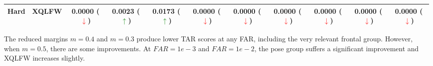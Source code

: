 \documentclass[class=report, crop=false, a4paper, 12pt]{standalone}
\begin{document}
\begin{table}[H]
{\begin{tabular}{cl|ccc|ccc|ccc|}
    \multicolumn{1}{|c|}{\multirow{-2}{*}{Hard}}    & XQLFW    & \multicolumn{1}{c|}{{\color[HTML]{333333} 0.0000 (\textcolor{red}{$\downarrow$})}} & \multicolumn{1}{c|}{{\color[HTML]{333333} 0.0023 (\textcolor{green}{$\uparrow$})}} & {\color[HTML]{333333} 0.0173 (\textcolor{green}{$\uparrow$})} & \multicolumn{1}{c|}{0.0000 (\textcolor{red}{$\downarrow$})} & \multicolumn{1}{c|}{0.0000 (\textcolor{red}{$\downarrow$})} & 0.0000 (\textcolor{red}{$\downarrow$}) & \multicolumn{1}{c|}{0.0000 (\textcolor{red}{$\downarrow$})} & \multicolumn{1}{c|}{0.0000 (\textcolor{red}{$\downarrow$})} & 0.0000 (\textcolor{red}{$\downarrow$}) \\ \hline
    \end{tabular}%
    }
\end{table}

The reduced margins $m=0.4$ and $m=0.3$ produce lower TAR scores at any FAR, including the very relevant frontal group. However, when $m=0.5$, there are some improvements. At $FAR=1e-3$ and $FAR=1e-2$, the pose group suffers a significant improvement and XQLFW increases slightly.
\end{document}
